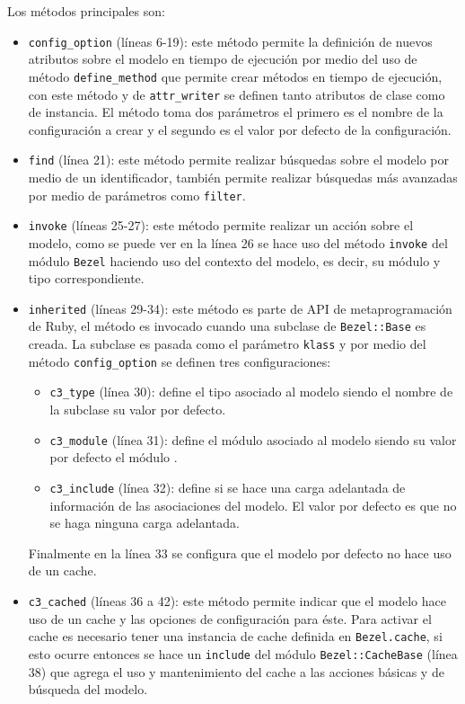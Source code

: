 Los métodos principales son:
\begin{itemize}
\item \texttt{config\_option} (líneas 6-19): este método permite la definición
  de nuevos atributos sobre el modelo en tiempo de ejecución por medio del uso
  de método \texttt{define\_method} que permite crear métodos en tiempo
  de ejecución, con este método y de \texttt{attr\_writer} se definen tanto
  atributos de clase como de instancia. El método toma dos parámetros
  el primero es el nombre de la configuración a crear y el segundo
  es el valor por defecto de la configuración.
\item \texttt{find} (línea 21): este método permite realizar búsquedas sobre
  el modelo por medio de un identificador, también permite realizar búsquedas
  más avanzadas por medio de parámetros como \texttt{filter}.
\item \texttt{invoke} (líneas 25-27): este método permite realizar
  un acción sobre el modelo, como se puede ver en la línea 26 se hace uso del
  método \texttt{invoke} del módulo \texttt{Bezel} haciendo
  uso del contexto del modelo, es decir, su módulo y tipo correspondiente.
\item \texttt{inherited} (líneas 29-34): este método es parte de API de
  metaprogramación de Ruby, el método es invocado cuando una subclase de
  \texttt{Bezel::Base} es creada. La subclase es pasada como el parámetro
  \texttt{klass} y por medio del método \texttt{config\_option} se definen
  tres configuraciones:
  \begin{itemize}
  \item \texttt{c3\_type} (línea 30): define el tipo asociado al modelo
    siendo el nombre de la subclase su valor por defecto.
  \item \texttt{c3\_module} (línea 31): define el módulo asociado al modelo
    siendo su valor por defecto el módulo .
  \item \texttt{c3\_include} (línea 32): define si se hace una carga adelantada
    de información de las asociaciones del modelo. El valor por defecto es que
    no se haga ninguna carga adelantada.
  \end{itemize}
  Finalmente en la línea 33 se configura que el modelo por defecto no hace uso
  de un cache.
\item \texttt{c3\_cached} (líneas 36 a 42): este método permite indicar
  que el modelo hace uso de un cache y las opciones de configuración para éste.
  Para activar el cache es necesario tener una instancia de cache definida en
  \texttt{Bezel.cache}, si esto ocurre entonces se hace un \texttt{include}
  del módulo \texttt{Bezel::CacheBase} (línea 38) que agrega el uso y
  mantenimiento del cache a las acciones básicas y de búsqueda del modelo.
\end{itemize}

